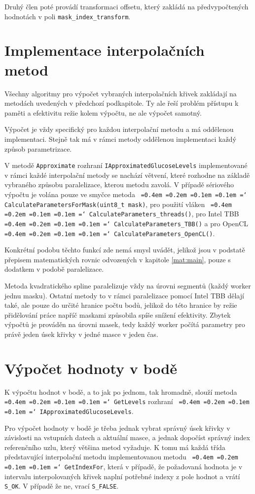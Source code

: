 \documentclass[]{thesiskiv}
\newcommand*\justify{
  \fontdimen2\font=0.4em
  \fontdimen3\font=0.2em
  \fontdimen4\font=0.1em
  \fontdimen7\font=0.1em
  \hyphenchar\font=`\-
}
\begin{document}
Druhý člen poté provádí transformaci offsetu, který zakládá na předvypočtených hodnotách v poli \texttt{mask\_index\_transform}.

\section{Implementace interpolačních metod}

Všechny algoritmy pro výpočet vybraných interpolačních křivek zakládají na metodách uvedených v předchozí podkapitole. Ty ale řeší problém přístupu k paměti a efektivitu režie kolem výpočtu, ne ale výpočet samotný.

Výpočet je vždy specifický pro každou interpolační metodu a má oddělenou implementaci. Stejně tak má v rámci metody oddělenou implementaci každý způsob parametrizace.

V metodě \texttt{Approximate} rozhraní \texttt{IApproximatedGlucoseLevels} implementované v rámci každé interpolační metody se nachází větvení, které rozhodne na základě vybraného způsobu paralelizace, kterou metodu zavolá. V případě sériového výpočtu je volána pouze ve smyčce metoda \texttt{\justify CalculateParametersForMask(uint8\_t mask)}, pro použití vláken \texttt{\justify CalculateParameters\_threads()}, pro Intel TBB \texttt{\justify CalculateParameters\_TBB()} a pro OpenCL \texttt{\justify CalculateParameters\_OpenCL()}.

Konkrétní podobu těchto funkcí zde nemá smysl uvádět, jelikož jsou v podstatě přepisem matematických rovnic odvozených v kapitole \ref{mat:main}, pouze s dodatkem v podobě paralelizace.

Metoda kvadratického spline paralelizuje vždy na úrovni segmentů (každý worker jednu masku). Ostatní metody to v rámci paralelizace pomocí Intel TBB dělají také, ale pouze do určité hranice počtu bodů, jelikož do této hranice by režie přidělování práce napříč maskami způsobila spíše snížení efektivity. Zbytek výpočtů je prováděn na úrovni masek, tedy každý worker počítá parametry pro právě jeden úsek křivky v jedné masce v jeden čas.

\section{Výpočet hodnoty v bodě}

K výpočtu hodnot v bodě, a to jak po jednom, tak hromadně, slouží metoda \texttt{\justify GetLevels} rozhraní \texttt{\justify IApproximatedGlucoseLevels}.

Pro výpočet hodnoty v bodě je třeba jednak vybrat správný úsek křivky v závislosti na vstupních datech a aktuální masce, a jednak dopočíst správný index referenčního uzlu, který většina metod vyžaduje. K tomu má každá třída představující interpolační metodu implementovanou metodu \texttt{\justify GetIndexFor}, která v případě, že požadovaná hodnota je v intervalu interpolovaných křivek naplní potřebné indexy z pole hodnot a vrátí \texttt{S\_OK}. V případě že ne, vrací \texttt{S\_FALSE}.
\end{document}
